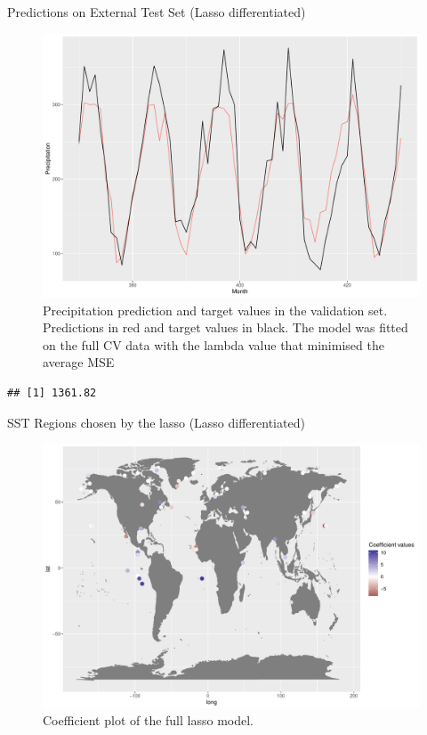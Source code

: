 \documentclass[
  ignorenonframetext,
]{beamer}
\begin{document}
\begin{frame}[fragile]{Predictions on External Test Set (Lasso
differentiated)}
\protect\hypertarget{predictions-on-external-test-set-lasso-differentiated}{}
\begin{figure}

{\centering \includegraphics[width=0.75\linewidth]{ma-presentation_files/figure-beamer/pred-plot-full-lasso-diff-1} 

}

\caption{Precipitation prediction and target values in the validation set. Predictions in red and target values in black. The model was fitted on the full CV data with the lambda value that minimised the average MSE}\label{fig:pred-plot-full-lasso-diff}
\end{figure}

\begin{verbatim}
## [1] 1361.82
\end{verbatim}
\end{frame}

\begin{frame}{SST Regions chosen by the lasso (Lasso differentiated)}
\protect\hypertarget{sst-regions-chosen-by-the-lasso-lasso-differentiated}{}
\begin{figure}

{\centering \includegraphics[width=0.75\linewidth]{ma-presentation_files/figure-beamer/coef-plot-full-lasso-diff-1} 

}

\caption{Coefficient plot of the full lasso model.}\label{fig:coef-plot-full-lasso-diff}
\end{figure}
\end{frame}
\end{document}
